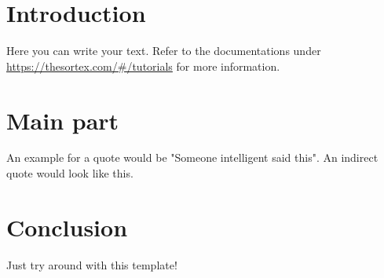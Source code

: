 \documentclass[12pt]{article}
\begin{document}

\clearpage

\mainmatter

\part{Introduction}
Here you can write your text. Refer to the documentations under \url{https://thesortex.com/#/tutorials} for more information.
\part{Main part}
An example for a quote would be "Someone intelligent said this". An indirect quote would look like this.
\part{Conclusion}
Just try around with this template!

\clearpage

\frontmatter

\renewcommand{\plaintitle}{Bibliography}
\setcounter{page}{5}
\printMyBibliography
\clearpage

\renewcommand{\plaintitle}{Appendix}
{\def\makebox[#1][#2]#3{#3}%
    \listofappendix
}
\end{document}
